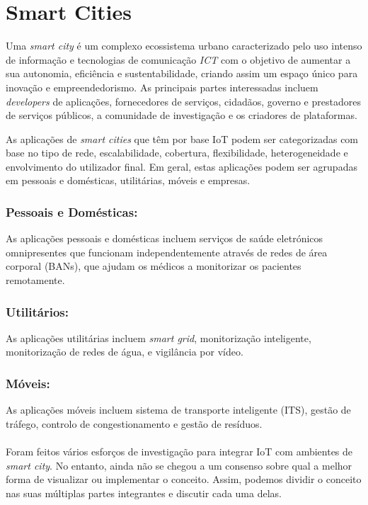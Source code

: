 \documentclass{llncs}
\begin{document}
\newpage
    
    
    
    
\section{Smart Cities}

    \par Uma \textit{smart city} é um complexo 
    ecossistema urbano caracterizado pelo uso intenso de informação e tecnologias de comunicação \textit{ICT} com o objetivo de aumentar a sua autonomia, eficiência e sustentabilidade, criando assim um espaço único para inovação e empreendedorismo. 
    As principais partes interessadas incluem \textit{developers} de aplicações, fornecedores de serviços, cidadãos, governo e prestadores de serviços públicos, a comunidade de investigação e os criadores de plataformas.
    \par As aplicações de \textit{smart cities} que têm por base IoT podem ser 
    categorizadas com base no tipo de rede, escalabilidade, cobertura,
    flexibilidade, heterogeneidade e envolvimento do
    utilizador final. Em geral, estas aplicações podem ser agrupadas
    em pessoais e domésticas, utilitárias, móveis e empresas.
    
    \subsubsection{Pessoais e Domésticas:} As aplicações pessoais e domésticas incluem serviços de saúde eletrónicos omnipresentes que funcionam independentemente através de redes de área corporal (BANs), que ajudam os médicos a monitorizar os pacientes remotamente.
    
    \subsubsection{Utilitários:} As aplicações utilitárias incluem \textit{smart
    grid}, monitorização inteligente, monitorização de redes de água, e 
    vigilância por vídeo.
    
    \subsubsection{Móveis:} As aplicações móveis incluem sistema de transporte
    inteligente (ITS), gestão de tráfego, controlo de congestionamento
    e gestão de resíduos. 
    
    \paragraph{}
    \par Foram feitos vários esforços de investigação para integrar IoT com
    ambientes de \textit{smart city}. No entanto, ainda não se chegou a um consenso
    sobre qual a melhor forma de visualizar ou implementar o conceito. Assim, 
    podemos dividir o conceito nas suas múltiplas partes integrantes e discutir cada uma delas. 
    
\end{document}

